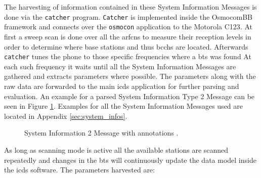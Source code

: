 The harvesting of information contained in these System Information Messages is done via the \texttt{catcher} program.
\texttt{Catcher} is implemented inside the OsmocomBB framework and connects over the \texttt{osmocon} application to the Motorola C123.
At first a sweep scan is done over all the \glspl{arfcn} to measure their reception levels in order to determine where base stations and thus \glspl{bcch} are located.
Afterwards \texttt{catcher} tunes the phone to those specific frequencies where a \gls{bts} was found 
At each such frequency it waits until all the System Information Messages are gathered and extracts parameters where possible.
The parameters along with the raw data are forwarded to the main \gls{icds} application for further parsing and evaluation.
An example for a parsed System Information Type 2 Message can be seen in Figure \ref{fig:sysinfo2}.
Examples for all the System Information Messages used are located in Appendix \ref{sec:system_infos}.
\begin{figure}
\centering
\caption{System Information 2 Message with annotations \cite{protocols1999}.}
\label{fig:sysinfo2}
\end{figure}
As long as scanning mode is active all the available stations are scanned repeatedly and changes in the \gls{bts} will continuously update the data model inside the \gls{icds} software.
The parameters harvested are:
